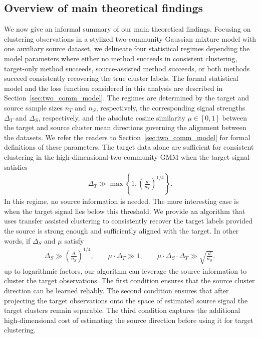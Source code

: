 \documentclass[10pt]{article}
\newcommand{\trg}{T}
\newcommand{\nT}{n_{\trg}}
\newcommand{\DeltaT}{\Delta_{\trg}}
\newcommand{\src}{S}
\newcommand{\nS}{n_{\src}}
\newcommand{\DeltaS}{\Delta_{\src}}
\begin{document}
\subsection{Overview of main theoretical findings}
\label{sec:overview_main_regimes}
We now give an informal summary of our main theoretical findings. Focusing on clustering observations in a stylized two-community Gaussian mixture model with one auxiliary source dataset, we delineate four statistical regimes depending the model parameters where either no method succeeds in consistent clustering, target-only method succeeds, source-assisted method succeeds, or both methods succeed consistently recovering the true cluster labels. The formal statistical model and the loss function considered in this analysis are described in Section~\ref{sec:two_comm_model}. The regimes are determined by the target and source sample sizes $\nT$ and $\nS$, respectively, the corresponding signal strengths $\DeltaT$ and $\DeltaS$, respectively, and the absolute cosine similarity $\mu\in[0,1]$ between the target and source cluster mean directions governing the alignment between the datasets. We refer the readers to Section~\ref{sec:two_comm_model} for formal definitions of these parameters.
The target data alone are sufficient for consistent clustering in the
high-dimensional two-community GMM when the target signal satisfies \citep{Ndaoud2022}
\begin{align}
\label{eq:lower_bound_2_clust_delt}
    \DeltaT \gg
    \max\left\{1,\left(\frac{d}{\nT}\right)^{1/4}\right\}.
\end{align}
In this regime, no source information is needed. The more interesting case is
when the target signal lies below this threshold. We provide an algorithm that uses transfer assisted clustering to consistently recover the target labels provided the source is strong enough and
sufficiently aligned with the target. In other words, if $\DeltaS$ and $\mu$ satisfy
\begin{align}
\label{eq:overview_transfer_regime}
    \DeltaS \gg \left(\frac{d}{\nS}\right)^{1/4},
    \qquad
    \mu\cdot\DeltaT \gg 1,
    \qquad
    \mu\cdot\DeltaS\cdot\DeltaT \gg \sqrt{\frac{d}{\nS}},
\end{align}
up to logarithmic factors, our algorithm can leverage the source information to cluster the target observations. 
The first condition ensures that the source cluster direction can be learned
reliably. The second condition ensures that after projecting the target observations onto the space of estimated source signal the target clusters remain separable. The third condition captures the
additional high-dimensional cost of estimating the source direction before
using it for target clustering.
\end{document}
